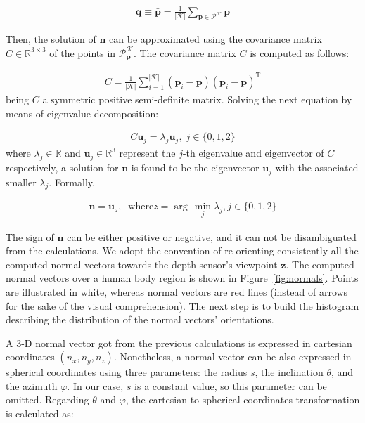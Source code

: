 \documentclass[10pt,twocolumn,letterpaper]{article}
\begin{document}
\begin{gather}
	\mathbf{q} \equiv \bar{\mathbf{p}} = \frac{1}{|\mathcal{K}|} \sum_{\mathbf{p} \in \mathcal{P}^{\mathcal{K}}} \mathbf{p}
\end{gather}
 
Then, the solution of $\mathbf{n}$ can be approximated using the covariance matrix $C \in \mathbb{R}^{3 \times 3}$ of the points in $\mathcal{P}_\mathbf{p}^{\mathcal{K}}$. The covariance matrix $C$ is computed as follows: 

\begin{gather}
	C = \frac{1}{|\mathcal{K}|} \sum_{i=1}^{|\mathcal{K}|} (\mathbf{p}_i - \bar{\mathbf{p}}) (\mathbf{p}_i - \bar{\mathbf{p}})^{\mathrm{T}}
\end{gather}
being $C$ a symmetric positive semi-definite matrix. Solving the next equation by means of eigenvalue decomposition:

\begin{gather}
	C \mathbf{u}_j = \lambda_j \mathbf{u}_j, \; j \in \{0,1,2\}
\end{gather}
where $\lambda_j \in \mathbb{R}$ and $\mathbf{u}_j \in \mathbb{R}^3$ represent the $j$-th eigenvalue and eigenvector of $C$ respectively, a solution for $\mathbf{n}$ is found to be the eigenvector $\mathbf{u}_j$ with the associated smaller $\lambda_j$. Formally,

\begin{gather}
	\mathbf{n} = \mathbf{u}_z, \;\; \mathrm{where}  z = \arg\,\min_{j}{\lambda_j}, j \in \{0,1,2\}
\end{gather}

The sign of $\mathbf{n}$ can be either positive or negative, and it can not be disambiguated from the calculations. We adopt the convention of re-orienting consistently all the computed normal vectors towards the depth sensor's viewpoint $\mathbf{z}$. The computed normal vectors over a human body region is shown in Figure~\ref{fig:normals}. Points are illustrated in white, whereas normal vectors are red lines (instead of arrows for the sake of the visual comprehension). The next step is to build the histogram describing the distribution of the normal vectors' orientations.

A 3-D normal vector got from the previous calculations is expressed in cartesian coordinates $(n_x, n_y, n_z)$. Nonetheless, a normal vector can be also expressed in spherical coordinates using three parameters: the radius $s$, the inclination $\theta$, and the azimuth $\varphi$. In our case, $s$ is a constant value, so this parameter can be omitted. Regarding $\theta$ and $\varphi$, the cartesian to spherical coordinates transformation is calculated as:
\end{document}
